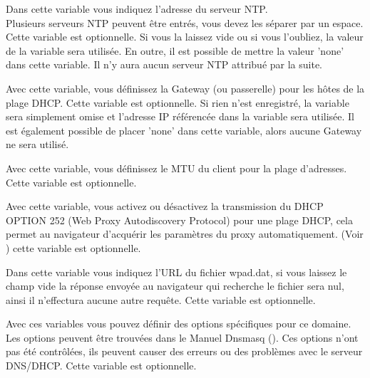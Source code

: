 \begin{description}

    {Dans cette variable vous indiquez l'adresse du serveur NTP. \\
	Plusieurs serveurs NTP peuvent être entrés, vous devez les séparer par un espace.
	Cette variable est optionnelle. Si vous la laissez vide ou si vous l'oubliez, la valeur
	de la variable  sera utilisée.
	En outre, il est possible de mettre la valeur 'none' dans cette variable. Il n'y
	aura aucun serveur NTP attribué par la suite.}


    {Avec cette variable, vous définissez la Gateway (ou passerelle) pour les hôtes
    de la plage DHCP. Cette variable est optionnelle. Si rien n'est enregistré,
    la variable sera simplement omise et l'adresse IP référencée dans la variable
     sera utilisée. Il est également possible de placer
    'none' dans cette variable, alors aucune Gateway ne sera utilisé.}


    {Avec cette variable, vous définissez le MTU du client pour la plage d'adresses.
	Cette variable est optionnelle.}

     
     {Avec cette variable, vous activez ou désactivez la transmission du DHCP OPTION 252
	 (Web Proxy Autodiscovery Protocol) pour une plage DHCP, cela permet au navigateur
	 d'acquérir les paramètres du proxy automatiquement.
	 (Voir )
	 cette variable est optionnelle.
     }
     
     
     {Dans cette variable vous indiquez l'URL du fichier wpad.dat, si vous laissez le champ
	 vide la réponse envoyée au navigateur qui recherche le fichier sera nul, ainsi il
	 n'effectura aucune autre requête. Cette variable est optionnelle.
     }


    {Avec ces variables vous pouvez définir des options spécifiques pour ce
    domaine. Les options peuvent être trouvées dans le Manuel Dnsmasq
    (). Ces
    options n'ont pas été contrôlées, ils peuvent causer des erreurs ou des
    problèmes avec le serveur DNS/DHCP. Cette variable est optionnelle.}
\end{description}


